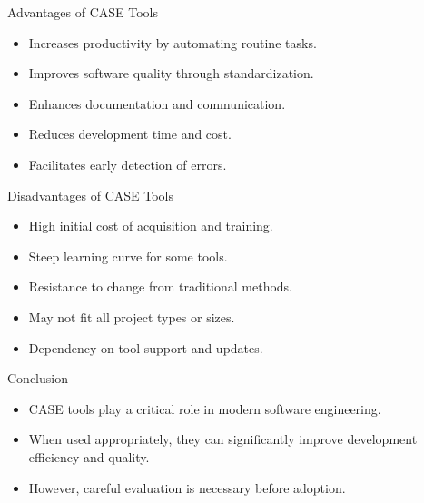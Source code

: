 \documentclass[14pt, aspectratio=169]{beamer}
\begin{document}
\begin{frame}{Advantages of CASE Tools}
	\begin{itemize}
		\item<1-> Increases productivity by automating routine tasks. \pause
		\item<2-> Improves software quality through standardization. \pause
		\item<3-> Enhances documentation and communication. \pause
		\item<4-> Reduces development time and cost. \pause
		\item<5-> Facilitates early detection of errors.
	\end{itemize}
\end{frame}

\begin{frame}{Disadvantages of CASE Tools}
	\begin{itemize}
		\item<1-> High initial cost of acquisition and training. \pause
		\item<2-> Steep learning curve for some tools. \pause
		\item<3-> Resistance to change from traditional methods. \pause
		\item<4-> May not fit all project types or sizes. \pause
		\item<5-> Dependency on tool support and updates.
	\end{itemize}
\end{frame}

\begin{frame}{Conclusion}
	\begin{itemize}
		\item<1-> CASE tools play a critical role in modern software engineering. \pause
		\item<2-> When used appropriately, they can significantly improve development efficiency and quality. \pause
		\item<3-> However, careful evaluation is necessary before adoption.
	\end{itemize}
\end{frame}
\end{document}
